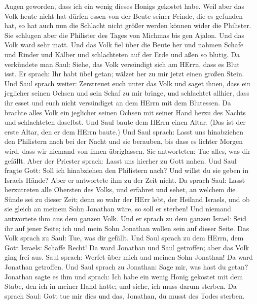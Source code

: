 Augen geworden, dass ich ein wenig dieses Honigs gekostet habe.
 Weil aber das Volk heute nicht hat dürfen essen von der
Beute seiner Feinde, die es gefunden hat, so hat auch nun die Schlacht
nicht größer werden können wider die Philister.  Sie
schlugen aber die Philister des Tages von Michmas bis gen Ajalon. Und
das Volk ward sehr matt.  Und das Volk fiel über die Beute
her und nahmen Schafe und Rinder und Kälber und schlachteten auf der
Erde und aßen so blutig.  Da verkündete man Saul: Siehe,
das Volk versündigt sich am HErrn, dass es Blut isst. Er sprach: Ihr
habt übel getan; wälzet her zu mir jetzt einen großen Stein.
 Und Saul sprach weiter: Zerstreuet euch unter das Volk und
saget ihnen, dass ein jeglicher seinen Ochsen und sein Schaf zu mir
bringe, und schlachtet allhier, dass ihr esset und euch nicht
versündiget an dem HErrn mit dem Blutessen. Da brachte alles Volk ein
jeglicher seinen Ochsen mit seiner Hand herzu des Nachts und
schlachteten daselbst.  Und Saul baute dem HErrn einen
Altar. (Das ist der erste Altar, den er dem HErrn baute.) 
Und Saul sprach: Lasst uns hinabziehen den Philistern nach bei der Nacht
und sie berauben, bis dass es lichter Morgen wird, dass wir niemand von
ihnen übriglassen. Sie antworteten: Tue alles, was dir gefällt. Aber der
Priester sprach: Lasst uns hierher zu Gott nahen.  Und Saul
fragte Gott: Soll ich hinabziehen den Philistern nach? Und willst du sie
geben in Israels Hände? Aber er antwortete ihm zu der Zeit nicht.
 Da sprach Saul: Lasst herzutreten alle Obersten des Volks,
und erfahret und sehet, an welchem die Sünde sei zu dieser Zeit;
 denn so wahr der HErr lebt, der Heiland Israels, und ob
sie gleich an meinem Sohn Jonathan wäre, so soll er sterben! Und niemand
antwortete ihm aus dem ganzen Volk.  Und er sprach zu dem
ganzen Israel: Seid ihr auf jener Seite; ich und mein Sohn Jonathan
wollen sein auf dieser Seite. Das Volk sprach zu Saul: Tue, was dir
gefällt.  Und Saul sprach zu dem HErrn, dem Gott Israels:
Schaffe Recht! Da ward Jonathan und Saul getroffen; aber das Volk ging
frei aus.  Saul sprach: Werfet über mich und meinen Sohn
Jonathan! Da ward Jonathan getroffen.  Und Saul sprach zu
Jonathan: Sage mir, was hast du getan? Jonathan sagte es ihm und sprach:
Ich habe ein wenig Honig gekostet mit dem Stabe, den ich in meiner Hand
hatte; und siehe, ich muss darum sterben.  Da sprach Saul:
Gott tue mir dies und das, Jonathan, du musst des Todes sterben.
